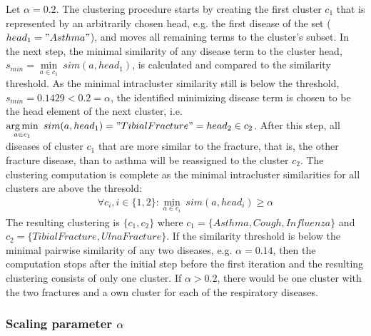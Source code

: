 \begin{exmp}
Let $\alpha=0.2$. The clustering procedure starts by creating the first cluster $c_1$ that is represented by an arbitrarily chosen head, e.g. the first disease 
of the set ($head_1="Asthma"$), and moves all remaining terms to the cluster's subset. In the next step, the minimal similarity of any disease term to the 
cluster head, $s_{min}=\min\limits_{a \in c_1}~sim(a, head_1)$, is calculated and compared to the similarity threshold. As the minimal intracluster similarity
still is below the threshold, $s_{min}=0.1429 < 0.2=\alpha$, the identified minimizing disease term is chosen to be the head element of the next cluster, i.e. 
$\operatorname*{arg\,min}\limits_{a \in c_1}~sim(a, head_1)="Tibial Fracture"=head_2 \in c_2$. After this step, all diseases of cluster $c_1$ that are more similar to the
fracture, that is, the other fracture disease, than to asthma will be reassigned to the cluster $c_2$. The clustering computation is complete as the minimal 
intracluster similarities for all clusters are above the thresold: 
\begin{align*}
    \forall c_i, i \in \{1,2\}: \min\limits_{a \in c_i}~sim(a, head_i) \geq \alpha
\end{align*}
The resulting clustering is $\{c_1, c_2\}$ where $c_1=\{Asthma,Cough,Influenza\}$ and $c_2=\{Tibial Fracture, Ulna Fracture\}$. If the similarity threshold is
below the minimal pairwise similarity of any two diseases, e.g. $\alpha=0.14$, then the computation stops after the initial step before the first iteration
and the resulting clustering consists of only one cluster. If $\alpha > 0.2$, there would be one cluster with the two fractures and a own cluster for each of 
the respiratory diseases.

\end{exmp}



\subsubsection{Scaling parameter $\alpha$}
\label{sec:impl_clust_alpha}

